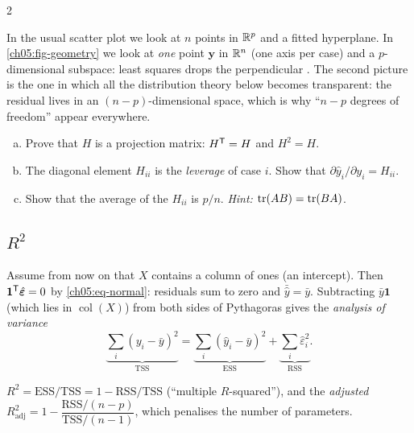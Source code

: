\begin{paracol}{2}
\begin{intuition}
In the usual scatter plot we look at $n$ points in $\mathbb{R}^{p}$ and a fitted hyperplane. In
\cref{ch05:fig-geometry} we look at \emph{one} point $\bm y$ in $\mathbb{R}^n$ (one axis per case) and a
$p$-dimensional subspace: least squares drops the perpendicular . The second picture is
the one in which all the distribution theory below becomes transparent: the residual lives in an
$(n-p)$-dimensional space, which is why ``$n-p$ degrees of freedom'' appear everywhere.
\end{intuition}

\begin{exercise}\label{ch05:ex-ps3-1ac}
\leavevmode
\begin{enumerate}[(a)]
  \item Prove that $H$ is a projection matrix: $H^{\mathsf T}=H$ and $H^2=H$.
  \item The diagonal element $H_{ii}$ is the \emph{leverage} of case $i$. Show that $\partial\hat y_i/\partial y_i=H_{ii}$.
  \item Show that the average of the $H_{ii}$ is $p/n$. \emph{Hint:} $\operatorname{tr}(AB)=\operatorname{tr}(BA)$.
\end{enumerate}
\end{exercise}

\subsection{\texorpdfstring{$R^2$}{R-squared}}
Assume from now on that $X$ contains a column of ones (an intercept). Then $\bm 1^{\mathsf T}\hat{\bm\varepsilon}=0$ by
\eqref{ch05:eq-normal}: residuals sum to zero and $\bar{\hat y}=\bar y$. Subtracting $\bar y\bm 1$ (which lies in
$\operatorname{col}(X)$) from both sides of Pythagoras gives the \emph{analysis of variance}
\[
  \underbrace{\sum_i(y_i-\bar y)^2}_{\text{TSS}}=\underbrace{\sum_i(\hat y_i-\bar y)^2}_{\text{ESS}}
  +\underbrace{\sum_i\hat\varepsilon_i^2}_{\text{RSS}} .
\]

\begin{definition}\label{ch05:def-r2}
$R^2=\text{ESS}/\text{TSS}=1-\text{RSS}/\text{TSS}$ (``multiple $R$-squared''), and the \emph{adjusted}
$R^2_{\text{adj}}=1-\dfrac{\text{RSS}/(n-p)}{\text{TSS}/(n-1)}$, which penalises the number of parameters.
\end{definition}


\end{paracol}
